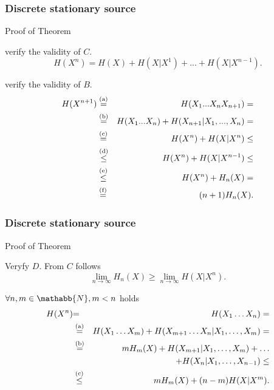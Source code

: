\documentclass[14pt]{beamer}
\begin{document}
\begin{frame}
\frametitle{Discrete stationary source}
Proof of Theorem
\begin{itemize}
\small{
    
    \item verify the validity of $C.$
    \[
    H(X^n) = H(X) + H(X\vert X^1) + ... + H(X\vert X^{n - 1}).
    \]

    \item verify the validity of $B.$
    \begin{eqnarray*}
    H(X^{n + 1}) & \stackrel{\rm (a)}{=} & H(X_1 ...X_n X_{n + 1} ) =\\
    &\stackrel{\rm (b)}{=}& H(X_1 ...X_n ) + H(X_{n+ 1} \vert
    X_1,...,X_n ) =\\
    &\stackrel{\rm (c)}{=}&   H(X^n) + H(X\vert X^n) \le \\
    &\stackrel{\rm (d)}{\le} & H(X^n) + H(X\vert X^{n - 1}) \le\\
    &\stackrel{\rm (e)}{\le} & H(X^n) + H_n (X) =\\
    &\stackrel{\rm (f)}{=}& (n + 1)H_n (X).
    \end{eqnarray*}
}
\end{itemize}
\end{frame}


\begin{frame}
\frametitle{Discrete stationary source}
Proof of Theorem
\begin{itemize}
\small{

    \item Veryfy $D$. From $C$ follows
    \begin{equation}
    \label{eq16}
    \mathop {\lim }\limits_{n \to \infty } H_n (X) \ge \mathop {\lim }\limits_{n
    \to \infty } H(X\vert X^n).
    \end{equation}

    \item $\forall n,m \in \mathabb{N}, m < n$ holds
    \begin{eqnarray*}
     H(X^n) & {=} & H(X_1\dots X_n ) = \\
    & \stackrel{\rm (a)}{=} & H(X_1\dots X_m ) + H(X_{m + 1}\dots X_n
    \vert X_1,\dots,X_m )
    =\\
    & \stackrel{\rm (b)}{=} & mH_m (X) + H(X_{m + 1} \vert X_1,\dots,X_m )+\dots \\
    &&+H(X_n \vert X_1 ,\dots,X_{n - 1} ) \le \\
    & \stackrel{\rm (c)}{\le} & mH_m (X) + (n - m)H(X\vert X^m).
    \end{eqnarray*}
}
\end{itemize}
\end{frame}
\end{document}
